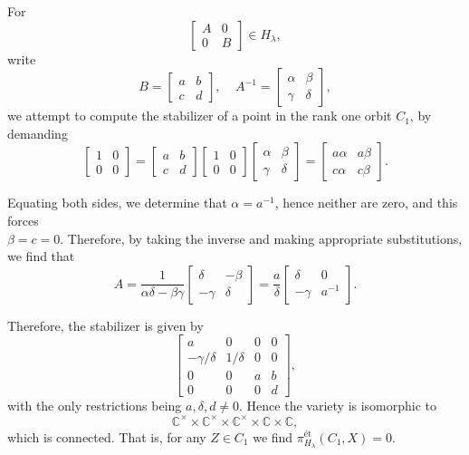 \documentclass{memoir}
\newcommand{\bc}{\mathbb{C}}
\newcommand{\tx}{\text}
\theoremstyle{definition}
\begin{document}
	For 
	$$\begin{bmatrix}
		A & 0 \\
		0 & B
	\end{bmatrix}\in H_\lambda,$$
	write
	$$B=\begin{bmatrix}
		a & b \\
		c & d
	\end{bmatrix}, \ \ \ \ \ A^{-1}=\begin{bmatrix}
		\alpha & \beta \\
		\gamma & \delta
	\end{bmatrix},$$
	we attempt to compute the stabilizer of a point in the rank one orbit $C_1$, by demanding
	$$\begin{bmatrix}
		1 & 0 \\
		0 & 0  
	\end{bmatrix}=\begin{bmatrix}
		a & b \\
		c & d
	\end{bmatrix}\begin{bmatrix}
		1 & 0 \\
		0 & 0 
	\end{bmatrix}\begin{bmatrix}
		\alpha & \beta \\
		\gamma & \delta
	\end{bmatrix}=\begin{bmatrix}
		a\alpha & a\beta \\
		c\alpha & c\beta
	\end{bmatrix}.$$
	
	Equating both sides, we determine that $\alpha=a^{-1}$, hence neither are zero, and this forces\\
	$\beta=c=0$.  
	Therefore, by taking the inverse and making appropriate substitutions, we find that 
	$$A=\frac{1}{\alpha\delta-\beta\gamma}\begin{bmatrix}
		\delta & -\beta\\
		-\gamma & \delta
	\end{bmatrix}=\frac{a}{\delta}\begin{bmatrix}
		\delta & 0 \\
		-\gamma & a^{-1}
	\end{bmatrix}.$$
	
	Therefore, the stabilizer is given by
	$$\begin{bmatrix}
		a & 0 & 0 & 0 \\
		-\gamma/\delta & 1/\delta & 0 & 0 \\
		0 & 0 & a & b \\
		0 & 0 & 0 & d
	\end{bmatrix},$$
	with the only restrictions being $a, \delta, d\neq 0$.  
	Hence the variety is isomorphic to 
	$$\bc^\times\times\bc^\times\times\bc^\times\times\bc\times\bc,$$
	which is connected.  
	That is, for any $Z\in C_1$ we find $\pi_{H_\lambda}^{\tx{\'et}}(C_1, X)=0$.  
	
\end{document}
